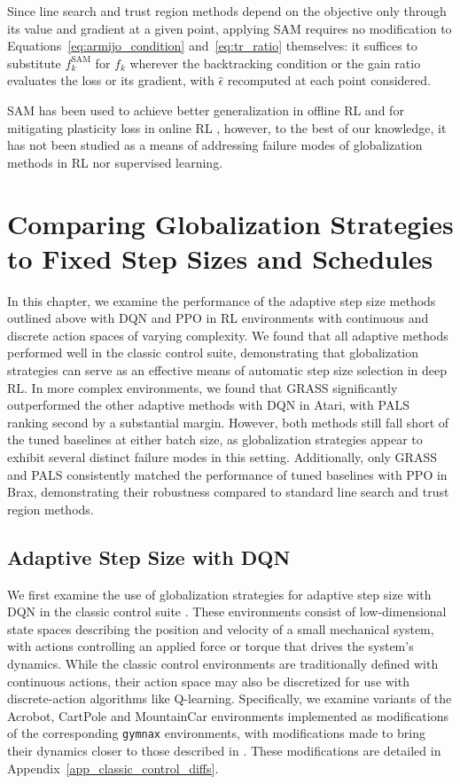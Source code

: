 Since line search and trust region methods depend on the objective only through its value and gradient at a given point, applying SAM requires no modification to Equations~\eqref{eq:armijo_condition} and~\eqref{eq:tr_ratio} themselves: it suffices to substitute $f_k^{\text{SAM}}$ for $f_k$ wherever the backtracking condition or the gain ratio evaluates the loss or its gradient, with $\hat{\epsilon}$ recomputed at each point considered.

SAM has been used to achieve better generalization in offline RL  and for mitigating plasticity loss in online RL , however, to the best of our knowledge, it has not been studied as a means of addressing failure modes of globalization methods in RL nor supervised learning.


\chapter{Comparing Globalization Strategies to Fixed Step Sizes and Schedules} \label{sec: benchmarking}
In this chapter, we examine the performance of the adaptive step size methods outlined above with DQN and PPO in RL environments with continuous and discrete action spaces of varying complexity. We found that all adaptive methods performed well in the classic control suite, demonstrating that globalization strategies can serve as an effective means of automatic step size selection in deep RL. In more complex environments, we found that GRASS significantly outperformed the other adaptive methods with DQN in Atari, with PALS ranking second by a substantial margin. However, both methods still fall short of the tuned baselines at either batch size, as globalization strategies appear to exhibit several distinct failure modes in this setting. Additionally, only GRASS and PALS consistently matched the performance of tuned baselines with PPO in Brax, demonstrating their robustness compared to standard line search and trust region methods. 

\section{Adaptive Step Size with DQN} \label{sec:dqn_results}
We first examine the use of globalization strategies for adaptive step size with DQN in the classic control suite . These environments consist of low-dimensional state spaces describing the position and velocity of a small mechanical system, with actions controlling an applied force or torque that drives the system's dynamics. While the classic control environments are traditionally defined with continuous actions, their action space may also be discretized for use with discrete-action algorithms like Q-learning. Specifically, we examine variants of the Acrobot, CartPole and MountainCar environments implemented as modifications of the corresponding \texttt{gymnax}  environments, with modifications made to bring their dynamics closer to those described in \cite{sutton1998introduction}. These modifications are detailed in Appendix~\ref{app_classic_control_diffs}.


